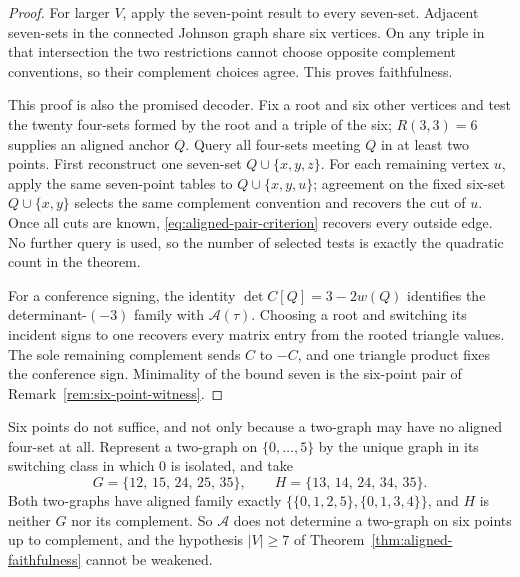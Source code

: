 \begin{proof}
For larger \(V\), apply the seven-point result to every seven-set.  Adjacent
seven-sets in the connected Johnson graph share six vertices.  On any triple
in that intersection the two restrictions cannot choose opposite complement
conventions, so their complement choices agree.  This proves faithfulness.

This proof is also the promised decoder.  Fix a root and six other vertices
and test the twenty four-sets formed by the root and a triple of the six;
\(R(3,3)=6\) supplies an aligned anchor \(Q\).  Query all four-sets meeting
\(Q\) in at least two points.  First reconstruct one seven-set
\(Q\cup\{x,y,z\}\).  For each remaining vertex \(u\), apply the same
seven-point tables to \(Q\cup\{x,y,u\}\); agreement on the fixed six-set
\(Q\cup\{x,y\}\) selects the same complement convention and recovers the
cut of \(u\).  Once all cuts are known,
\eqref{eq:aligned-pair-criterion} recovers every outside edge.
No further query is used, so the number of selected tests is exactly the
quadratic count in the theorem.

For a conference signing, the identity
\(\det C[Q]=3-2w(Q)\) identifies the determinant-\((-3)\) family with
\(\mathcal A(\tau)\).  Choosing a root and switching its incident signs to
one recovers every matrix entry from the rooted triangle values.  The sole
remaining complement sends \(C\) to \(-C\), and one triangle product fixes
the conference sign.  Minimality of the bound seven is the six-point pair of
Remark~\ref{rem:six-point-witness}.
\end{proof}

\begin{remark}
\label{rem:six-point-witness}
Six points do not suffice, and not only because a two-graph may have no
aligned four-set at all.  Represent a two-graph on \(\{0,\dots,5\}\) by the
unique graph in its switching class in which \(0\) is isolated, and take
\[
 G=\{12,\,15,\,24,\,25,\,35\},
 \qquad
 H=\{13,\,14,\,24,\,34,\,35\}.
\]
Both two-graphs have aligned family exactly
\(\bigl\{\{0,1,2,5\},\{0,1,3,4\}\bigr\}\), and \(H\) is neither \(G\) nor its
complement.  So \(\mathcal A\) does not determine a two-graph on six points up
to complement, and the hypothesis \(|V|\ge7\) of
Theorem~\ref{thm:aligned-faithfulness} cannot be weakened.
\end{remark}

